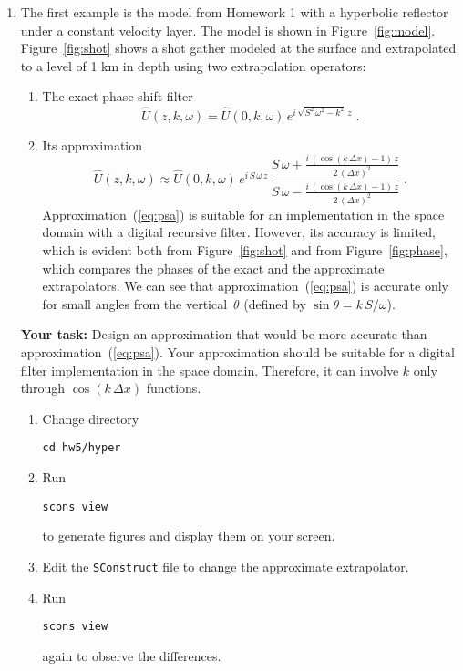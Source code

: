 \begin{enumerate}

\item The first example is the model from Homework 1 with a hyperbolic
  reflector under a constant velocity layer.  The model is shown in
  Figure~\ref{fig:model}. Figure~\ref{fig:shot} shows a shot gather
  modeled at the surface and extrapolated to a level of 1 km in depth
  using two extrapolation operators: 
  \begin{enumerate}
  \item The exact phase shift filter
    \begin{equation}
      \label{eq:ps}
      \hat{U}(z,k,\omega) = \hat{U}(0,k,\omega)\,e^{i\,\sqrt{S^2\,\omega^2 - k^2}\,z}\;.
    \end{equation}
  \item Its approximation
    \begin{equation}
      \label{eq:psa}
      \hat{U}(z,k,\omega) \approx \hat{U}(0,k,\omega)\,
      e^{i\,S\,\omega\,z}\,
      \frac
      {\displaystyle S\,\omega + \frac{i\,\left(\cos{(k\,\Delta x)}-1\right)\,z}{2\,(\Delta x)^2}}
      {\displaystyle S\,\omega - \frac{i\,\left(\cos{(k\,\Delta x)}-1\right)\,z}{2\,(\Delta x)^2}}\;.
    \end{equation}
    Approximation~(\ref{eq:psa}) is suitable for an implementation in the space domain
    with a digital recursive filter. However, its accuracy is limited,
    which is evident both from Figure~\ref{fig:shot} and from
    Figure~\ref{fig:phase}, which compares the phases of the exact and
    the approximate extrapolators. We can see that
    approximation~(\ref{eq:psa}) is accurate only for small angles
    from the vertical~$\theta$ (defined by $\sin{\theta} = k\,S/\omega$). 
  \end{enumerate}

  \textbf{Your task:} Design an approximation that would be more accurate
    than approximation~(\ref{eq:psa}). Your approximation should be
    suitable for a digital filter implementation in the space
    domain. Therefore, it can involve $k$ only through $\cos{(k\,\Delta
      x)}$ functions.
    \begin{enumerate}
    \item Change directory 
\begin{verbatim}
cd hw5/hyper
\end{verbatim}
    \item Run
\begin{verbatim}
scons view
\end{verbatim}
      to generate figures and display them on your screen.  
    \item Edit the \texttt{SConstruct} file to change the approximate extrapolator.
    \item Run
\begin{verbatim}
scons view
\end{verbatim}
      again to observe the differences.
    \end{enumerate}


\end{enumerate}

